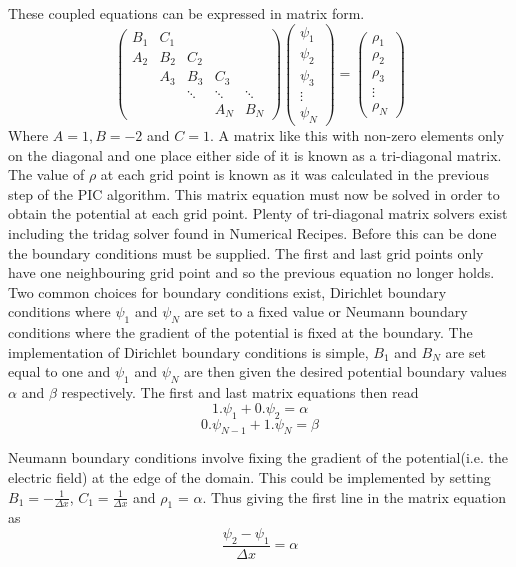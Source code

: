 \documentclass[12pt]{article}
\def\be{\begin{equation}}
\def\ee{\end{equation}}
\begin{document}
These coupled equations can be expressed in matrix form. 
\be
\begin{pmatrix}
  B_{1} & C_{1}  \\
  A_{2} & B_{2} & C_2 \\
        & A_3  & B_3 & C_3   \\
        & & \ddots & \ddots & \ddots \\
        & & &  A_N & B_N
\end{pmatrix}
\begin{pmatrix} 
 \psi_1  \\ 
 \psi_2  \\ 
 \psi_3  \\ 
 \vdots  \\
 \psi_N
\end{pmatrix}
= 
\begin{pmatrix} 
 \rho_1  \\ 
 \rho_2  \\ 
 \rho_3  \\ 
 \vdots  \\
 \rho_N
\end{pmatrix}
\ee
Where $A=1, B=-2$ and $C=1$. A matrix like this with non-zero elements only on the diagonal and one place either side of it is known as a tri-diagonal matrix.  The value of $\rho$ at each grid point is known as it was calculated in the previous step of the PIC algorithm. This matrix equation must now be solved in order to obtain the potential at each grid point. Plenty of tri-diagonal matrix solvers exist including the tridag solver found in Numerical Recipes\cite{NumericalRecipes}. Before this can be done the boundary conditions must be supplied. The first and last grid points only have one neighbouring grid point and so the previous equation no longer holds. Two common choices for boundary conditions exist, Dirichlet boundary conditions where $\psi_1$ and $\psi_N$ are set to a fixed value or Neumann boundary conditions where the gradient of the potential is fixed at the boundary. 
The implementation of Dirichlet boundary conditions is simple, $B_1$ and $B_N$ are set equal to one and $\psi_1$ and $\psi_N$ are then given the desired potential boundary values $\alpha $ and $\beta$  respectively. The first and last matrix equations then read
\be 
1.\psi_1 + 0.\psi_2 = \alpha 
\ee 
\be 
0.\psi_{N-1} + 1.\psi_N = \beta 
\ee 

Neumann boundary conditions involve fixing the gradient of the potential(i.e. the electric field) at the edge of the domain. This could be implemented by setting $B_1  = -\frac{1}{\Delta x}$, $C_1 = \frac{1}{\Delta x}$ and $\rho_1$ = $\alpha$. Thus giving the first line in the matrix equation as 
\be 
\frac{\psi_2 - \psi_1}{\Delta x} = \alpha 
\ee 
\end{document}
